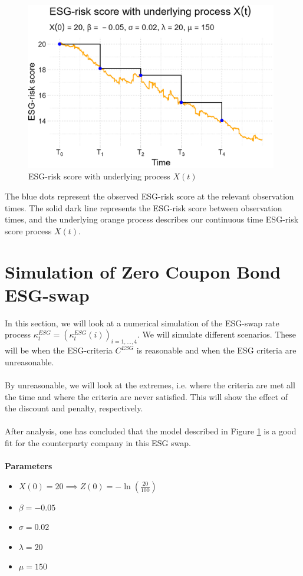 \begin{figure}[htp]
    \centering
    \includegraphics[width=11cm]{figures/ESG/ESG_OU_path.png}
    \caption{ESG-risk score with underlying process $X(t)$}
    \label{fig: ESG_risk_score_underlying_X(t)}
\end{figure}

The blue dots represent the observed ESG-risk score at the relevant observation times. The solid dark line represents the ESG-risk score between observation times, and the underlying orange process describes our continuous time ESG-risk score process $X(t)$.  

\newpage 

\section{Simulation of Zero Coupon Bond ESG-swap}

In this section, we will look at a numerical simulation of the ESG-swap rate process $\kappa_{t}^{ESG} = (\kappa_{t}^{ESG}(i))_{i=1, \dots, 4}$. We will simulate different scenarios. These will be when the ESG-criteria $C^{ESG}$ is reasonable and when the ESG criteria are unreasonable. 
\\~\\
By unreasonable, we will look at the extremes, i.e. where the criteria are met all the time and where the criteria are never satisfied. This will show the effect of the discount and penalty, respectively. 
\\~\\ 
After analysis, one has concluded that the model described in Figure \ref{fig: ESG_risk_score_underlying_X(t)} is a good fit for the counterparty company in this ESG swap. 
\\~\\
\textbf{Parameters}
\begin{itemize}
    \item $X(0) = 20 \implies Z(0) = -\ln\left(\frac{20}{100}\right)$
    \item $\beta = -0.05$
    \item $\sigma = 0.02$
    \item $\lambda = 20$
    \item $\mu = 150$
\end{itemize}

